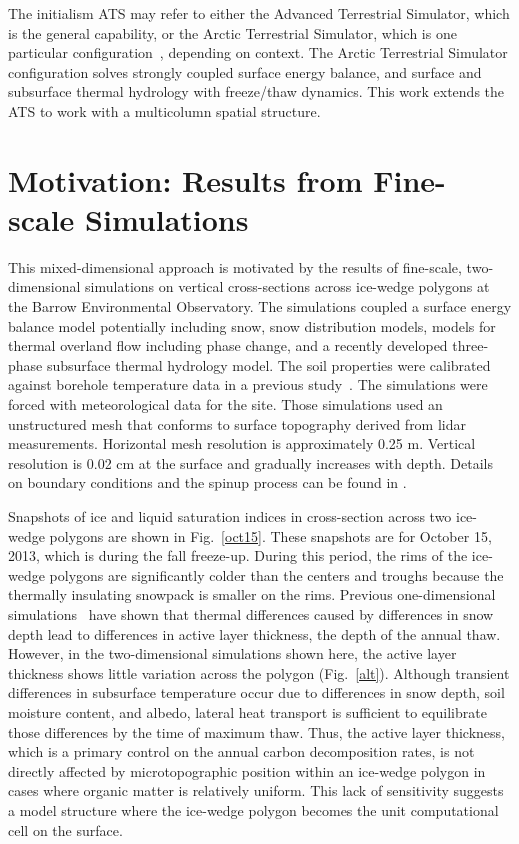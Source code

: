 \documentclass[review,11pt]{elsarticle}
\begin{document}
 The initialism ATS may refer to either the Advanced Terrestrial Simulator, which is the general capability, or the Arctic Terrestrial Simulator, which is one particular configuration~\cite{spainter2016integrated}, depending on context. The Arctic Terrestrial Simulator configuration solves strongly coupled surface energy balance, and surface and subsurface thermal hydrology with freeze/thaw dynamics. This work extends the ATS to work with a multicolumn spatial structure. 


\section{Motivation: Results from Fine-scale Simulations}\label{motivation}

This mixed-dimensional approach is motivated by the results of fine-scale, two-dimensional simulations on vertical cross-sections across ice-wedge polygons at the Barrow Environmental Observatory. The simulations coupled a surface energy balance model potentially including snow, snow distribution models, models for thermal overland flow including phase change, and a recently developed three-phase subsurface thermal hydrology model. The soil properties were calibrated against borehole temperature data in a previous study~\cite{atchley2015}. The simulations were forced with meteorological data for the site. Those simulations used an unstructured mesh that conforms to surface topography derived from lidar measurements. Horizontal mesh resolution is approximately 0.25 m. Vertical resolution is 0.02 cm at the surface and gradually increases with depth. Details on boundary conditions and the spinup process can be found in \cite{spainter2016integrated}. 

Snapshots of ice and liquid saturation indices in cross-section across two ice-wedge polygons are shown in Fig.~\ref{oct15}. These snapshots are for October 15, 2013, which is during the fall freeze-up. During this period, the rims of the ice-wedge polygons are significantly colder than the centers and troughs because the thermally insulating snowpack is smaller on the rims. Previous one-dimensional simulations~\cite{atchley2016} have shown that thermal differences caused by differences in snow depth lead to differences in active layer thickness, the depth of the annual thaw. However, in the two-dimensional simulations shown here, the active layer thickness shows little variation across the polygon (Fig.~\ref{alt}). Although transient differences in subsurface temperature occur due to differences in snow depth, soil moisture content, and albedo, lateral heat transport is sufficient to equilibrate those differences by the time of maximum thaw. Thus, the active layer thickness, which is a primary control on the annual carbon decomposition rates, is not directly affected by microtopographic position within an ice-wedge polygon in cases where organic matter is relatively uniform. This lack of sensitivity suggests a model structure where the ice-wedge polygon becomes the unit computational cell on the surface. 
\end{document}
